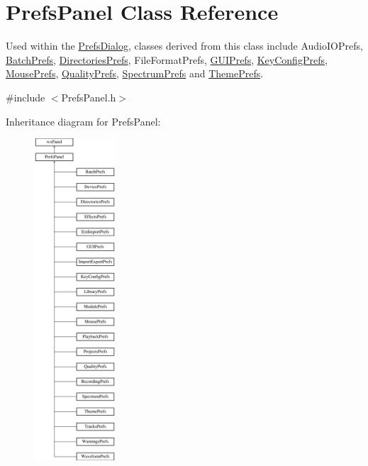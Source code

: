 \hypertarget{class_prefs_panel}{}\section{Prefs\+Panel Class Reference}
\label{class_prefs_panel}


Used within the \hyperlink{class_prefs_dialog}{Prefs\+Dialog}, classes derived from this class include Audio\+I\+O\+Prefs, \hyperlink{class_batch_prefs}{Batch\+Prefs}, \hyperlink{class_directories_prefs}{Directories\+Prefs}, File\+Format\+Prefs, \hyperlink{class_g_u_i_prefs}{G\+U\+I\+Prefs}, \hyperlink{class_key_config_prefs}{Key\+Config\+Prefs}, \hyperlink{class_mouse_prefs}{Mouse\+Prefs}, \hyperlink{class_quality_prefs}{Quality\+Prefs}, \hyperlink{class_spectrum_prefs}{Spectrum\+Prefs} and \hyperlink{class_theme_prefs}{Theme\+Prefs}.  




{\ttfamily \#include $<$Prefs\+Panel.\+h$>$}

Inheritance diagram for Prefs\+Panel\+:\begin{figure}[H]
\begin{center}
\leavevmode
\includegraphics[height=12.000000cm]{class_prefs_panel}
\end{center}
\end{figure}
